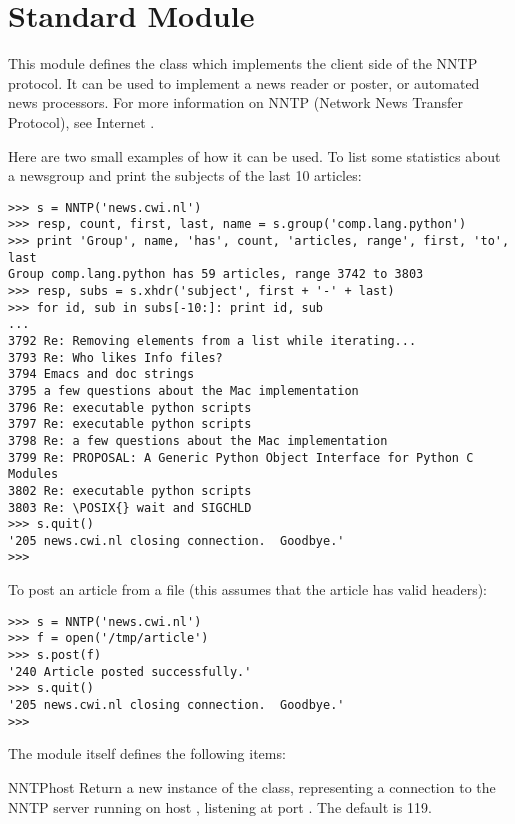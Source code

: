 \section{Standard Module }
\label{module-nntplib}

\renewcommand{\indexsubitem}{(in module nntplib)}

This module defines the class  which implements the client
side of the NNTP protocol.  It can be used to implement a news reader
or poster, or automated news processors.  For more information on NNTP
(Network News Transfer Protocol), see Internet .

Here are two small examples of how it can be used.  To list some
statistics about a newsgroup and print the subjects of the last 10
articles:

\bcode\begin{verbatim}
>>> s = NNTP('news.cwi.nl')
>>> resp, count, first, last, name = s.group('comp.lang.python')
>>> print 'Group', name, 'has', count, 'articles, range', first, 'to', last
Group comp.lang.python has 59 articles, range 3742 to 3803
>>> resp, subs = s.xhdr('subject', first + '-' + last)
>>> for id, sub in subs[-10:]: print id, sub
... 
3792 Re: Removing elements from a list while iterating...
3793 Re: Who likes Info files?
3794 Emacs and doc strings
3795 a few questions about the Mac implementation
3796 Re: executable python scripts
3797 Re: executable python scripts
3798 Re: a few questions about the Mac implementation 
3799 Re: PROPOSAL: A Generic Python Object Interface for Python C Modules
3802 Re: executable python scripts 
3803 Re: \POSIX{} wait and SIGCHLD
>>> s.quit()
'205 news.cwi.nl closing connection.  Goodbye.'
>>> 
\end{verbatim}\ecode

To post an article from a file (this assumes that the article has
valid headers):

\bcode\begin{verbatim}
>>> s = NNTP('news.cwi.nl')
>>> f = open('/tmp/article')
>>> s.post(f)
'240 Article posted successfully.'
>>> s.quit()
'205 news.cwi.nl closing connection.  Goodbye.'
>>> 
\end{verbatim}\ecode
%
The module itself defines the following items:

\begin{funcdesc}{NNTP}{host}
Return a new instance of the  class, representing a
connection to the NNTP server running on host , listening at
port .  The default  is 119.
\end{funcdesc}

